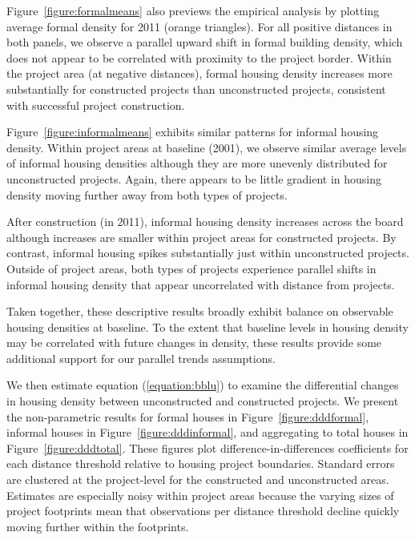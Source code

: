 \documentclass[12pt]{article}
\begin{document}
Figure~\ref{figure:formalmeans} also previews the empirical analysis by plotting average formal density for 2011 (orange triangles).  For all positive distances in both panels, we observe a parallel upward shift in formal building density, which does not appear to be correlated with proximity to the project border.  Within the project area (at negative distances), formal housing density increases more substantially for constructed projects than unconstructed projects, consistent with successful project construction.

Figure~\ref{figure:informalmeans} exhibits similar patterns for informal housing density.  Within project areas at baseline (2001), we observe similar average levels of informal housing densities although they are more unevenly distributed for unconstructed projects.  Again, there appears to be little gradient in housing density moving further away from both types of projects.

After construction (in 2011), informal housing density increases across the board although increases are smaller within project areas for constructed projects.  By contrast, informal housing spikes substantially just within unconstructed projects.  Outside of project areas, both types of projects experience parallel shifts in informal housing density that appear uncorrelated with distance from projects.

Taken together, these descriptive results broadly exhibit balance on observable housing densities at baseline.  To the extent that baseline levels in housing density may be correlated with future changes in density, these results provide some additional support for our parallel trends assumptions.


We then estimate equation (\ref{equation:bblu}) to examine the differential changes in housing density between unconstructed and constructed projects.  We present the non-parametric results for formal houses in Figure~\ref{figure:dddformal}, informal houses in Figure~\ref{figure:dddinformal}, and aggregating to total houses in Figure~\ref{figure:dddtotal}.  These figures plot difference-in-differences coefficients for each distance threshold relative to housing project boundaries.  Standard errors are clustered at the project-level for the constructed and unconstructed areas.  Estimates are especially noisy within project areas because the varying sizes of project footprints mean that observations per distance threshold decline quickly moving further within the footprints.
\end{document}
